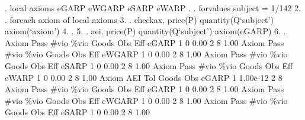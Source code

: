 . local axioms eGARP eWGARP eSARP eWARP
{\smallskip}
. 
. forvalues subject = 1/142 {\lbr}
  2.         
.         foreach axiom of local axioms {\lbr}
  3.         
.                 checkax, price(P) quantity(Q`subject') axiom(`axiom')
  4.                 
.         {\rbr}
  5. 
.         aei, price(P) quantity(Q`subject') axiom(eGARP)
  6. 
. {\rbr}
{\smallskip}
{\smallskip}
{\smallskip}
       Axiom {\VBAR} Pass        \#vio        \%vio       Goods         Obs         Eff  
       eGARP {\VBAR}    1           0        0.00           2           8        1.00  
{\smallskip}
{\smallskip}
{\smallskip}
       Axiom {\VBAR} Pass        \#vio        \%vio       Goods         Obs         Eff  
      eWGARP {\VBAR}    1           0        0.00           2           8        1.00  
{\smallskip}
{\smallskip}
{\smallskip}
       Axiom {\VBAR} Pass        \#vio        \%vio       Goods         Obs         Eff  
       eSARP {\VBAR}    1           0        0.00           2           8        1.00  
{\smallskip}
{\smallskip}
{\smallskip}
       Axiom {\VBAR} Pass        \#vio        \%vio       Goods         Obs         Eff  
       eWARP {\VBAR}    1           0        0.00           2           8        1.00  
{\smallskip}
       Axiom {\VBAR}       AEI        Tol      Goods        Obs 
       eGARP {\VBAR}         1   1.00e-12          2          8 
{\smallskip}
{\smallskip}
{\smallskip}
       Axiom {\VBAR} Pass        \#vio        \%vio       Goods         Obs         Eff  
       eGARP {\VBAR}    1           0        0.00           2           8        1.00  
{\smallskip}
{\smallskip}
{\smallskip}
       Axiom {\VBAR} Pass        \#vio        \%vio       Goods         Obs         Eff  
      eWGARP {\VBAR}    1           0        0.00           2           8        1.00  
{\smallskip}
{\smallskip}
{\smallskip}
       Axiom {\VBAR} Pass        \#vio        \%vio       Goods         Obs         Eff  
       eSARP {\VBAR}    1           0        0.00           2           8        1.00  
{\smallskip}
